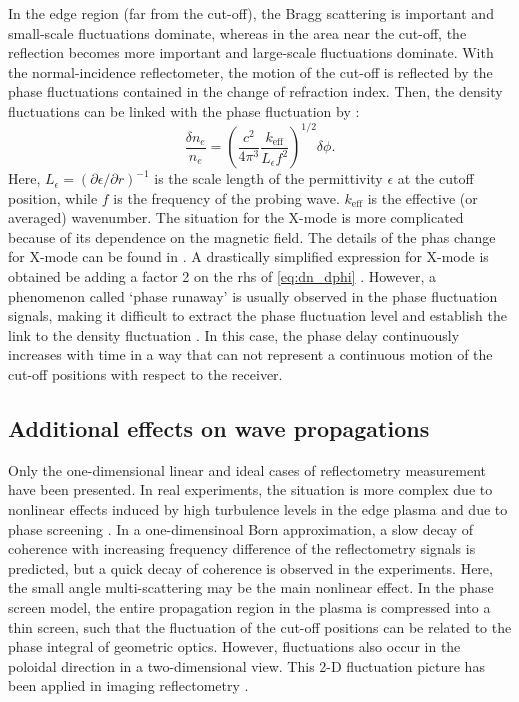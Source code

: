 In the edge region (far from the cut-off), the Bragg scattering is important and small-scale fluctuations dominate, whereas in the area near the cut-off, the reflection becomes more important and large-scale fluctuations dominate. With the normal-incidence reflectometer, the motion of the cut-off is reflected by the phase fluctuations contained in the change of refraction index. Then, the density fluctuations can be linked with the phase fluctuation by \cite{Mazzucato_1998_RSI}:%
\begin{equation}\label{eq:dn_dphi}
    \frac{\delta n_e}{n_e}=\left(\frac{c^2}{4\pi^3}\frac{k_\mathrm{eff}}{L_{\epsilon}f^2}\right)^{1/2}\delta\phi.
\end{equation}
Here, $L_{\epsilon}=(\partial\epsilon/\partial r)^{-1}$ is the scale length of the permittivity $\epsilon$ at the cutoff position, while $f$ is the frequency of the probing wave. $k_\mathrm{eff}$ is the effective (or averaged) wavenumber. The situation for the X-mode is more complicated because of its dependence on the magnetic field. The details of the phas change for X-mode can be found in \cite{Colin_2001_thesis}. A drastically simplified expression for X-mode is obtained be adding a factor 2 on the rhs of \eqref{eq:dn_dphi} \cite{Mazzucato_1998_RSI, Colin_2001_thesis}. However, a phenomenon called `phase runaway' is usually observed in the phase fluctuation signals, making it difficult to extract the phase fluctuation level and establish the link to the density fluctuation \cite{Ejiri_1997_PPCF_phase_jump}. In this case, the phase delay continuously increases with time in a way that can not represent a continuous motion of the cut-off positions with respect to the receiver.



\subsection{Additional effects on wave propagations} \label{effects_on_wave_propagation}

Only the one-dimensional linear and ideal cases of reflectometry measurement have been presented. In real experiments, the situation is more complex due to nonlinear effects \cite{Gusakov_2002_PPCF} induced by high turbulence levels in the edge plasma and due to phase screening \cite{Mazzucato_PPCF_91_reflecto}. In a one-dimensinoal Born approximation, a slow decay of coherence with increasing frequency difference of the reflectometry signals is predicted, but a quick decay of coherence is observed in the experiments. Here, the small angle multi-scattering may be the main nonlinear effect. In the phase screen model, the entire propagation region in the plasma is compressed into a thin screen, such that the fluctuation of the cut-off positions can be related to the phase integral of geometric optics. However, fluctuations also occur in the poloidal direction in a two-dimensional view. This 2-D fluctuation picture has been applied in imaging reflectometry \cite{Muscatello_2014_RSI, Wang_2017_NF}.


